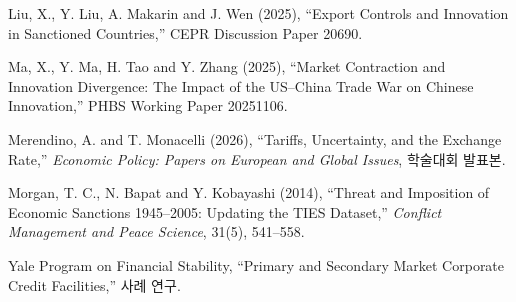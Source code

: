 \documentclass[11pt,a4paper]{article}
\begin{document}
\bibitemx Liu, X., Y. Liu, A. Makarin and J. Wen (2025), ``Export Controls and Innovation in Sanctioned Countries,'' CEPR Discussion Paper 20690.\par
\bibitemx Ma, X., Y. Ma, H. Tao and Y. Zhang (2025), ``Market Contraction and Innovation Divergence: The Impact of the US--China Trade War on Chinese Innovation,'' PHBS Working Paper 20251106.\par
\bibitemx Merendino, A. and T. Monacelli (2026), ``Tariffs, Uncertainty, and the Exchange Rate,'' \textit{Economic Policy: Papers on European and Global Issues}, 학술대회 발표본.\par
\bibitemx Morgan, T. C., N. Bapat and Y. Kobayashi (2014), ``Threat and Imposition of Economic Sanctions 1945--2005: Updating the TIES Dataset,'' \textit{Conflict Management and Peace Science}, 31(5), 541--558.\par
\bibitemx Yale Program on Financial Stability, ``Primary and Secondary Market Corporate Credit Facilities,'' 사례 연구.\par
\endgroup

\appendix
\end{document}
